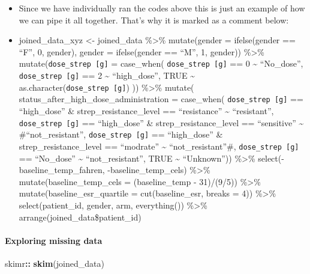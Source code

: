 \documentclass[
]{article}
\newenvironment{Shaded}{\begin{snugshade}}{\end{snugshade}}
\newcommand{\FunctionTok}[1]{\textcolor[rgb]{0.13,0.29,0.53}{\textbf{#1}}}
\newcommand{\NormalTok}[1]{#1}
\newcommand{\SpecialCharTok}[1]{\textcolor[rgb]{0.81,0.36,0.00}{\textbf{#1}}}
\begin{document}
\begin{itemize}
\item
  Since we have individually ran the codes above this is just an example
  of how we can pipe it all together. That's why it is marked as a
  comment below:
\item
  joined\_data\_xyz \textless- joined\_data \%\textgreater\%
  mutate(gender = ifelse(gender == ``F'', 0, gender), gender =
  ifelse(gender == ``M'', 1, gender)) \%\textgreater\%
  mutate(\texttt{dose\_strep\ {[}g{]}} = case\_when(
  \texttt{dose\_strep\ {[}g{]}} == 0 \textasciitilde{} ``No\_dose'',
  \texttt{dose\_strep\ {[}g{]}} == 2 \textasciitilde{} ``high\_dose'',
  TRUE \textasciitilde{} as.character(\texttt{dose\_strep\ {[}g{]}}) ))
  \%\textgreater\% mutate( status\_after\_high\_dose\_administration =
  case\_when( \texttt{dose\_strep\ {[}g{]}} == ``high\_dose'' \&
  strep\_resistance\_level == ``resistance'' \textasciitilde{}
  ``resistant'', \texttt{dose\_strep\ {[}g{]}} == ``high\_dose'' \&
  strep\_resistance\_level == ``sensitive'' \textasciitilde{}
  \#``not\_resistant'', \texttt{dose\_strep\ {[}g{]}} == ``high\_dose''
  \& strep\_resistance\_level == ``modrate'' \textasciitilde{}
  ``not\_resistant''\#, \texttt{dose\_strep\ {[}g{]}} == ``No\_dose''
  \textasciitilde{} ``not\_resistant'', TRUE \textasciitilde{}
  ``Unknown'')) \%\textgreater\% select(-baseline\_temp\_fahren,
  -baseline\_temp\_cels) \%\textgreater\% mutate(baseline\_temp\_cels =
  (baseline\_temp - 31)/(9/5)) \%\textgreater\%
  mutate(baseline\_esr\_quartile = cut(baseline\_esr, breaks = 4))
  \%\textgreater\% select(patient\_id, gender, arm, everything())
  \%\textgreater\% arrange(joined\_data\$patient\_id)
\end{itemize}

\paragraph{Exploring missing data}\label{exploring-missing-data}

\begin{Shaded}
\begin{Highlighting}[]
\NormalTok{skimr}\SpecialCharTok{::} \FunctionTok{skim}\NormalTok{(joined\_data)}
\end{Highlighting}
\end{Shaded}
\end{document}
